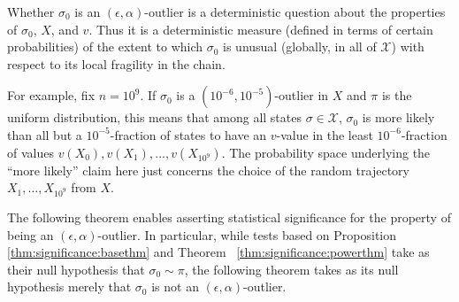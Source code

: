 \documentclass[12pt]{article}
\begin{document}
Whether \( \sigma_0 \) is an \( (\epsilon, \alpha) \)-outlier is a
deterministic question about the properties of \( \sigma_0 \), \( X \),
and \( v \).  Thus it is a deterministic measure (defined in terms of
certain probabilities) of the extent to which \( \sigma_0 \) is unusual
(globally, in all of \( \mathcal{X} \)) with respect to its local
fragility in the chain.

\begin{example}
    For example, fix \( n = 10^9 \).  If \( \sigma_0 \) is a \( (10^{-6},
    10^{-5}) \)-outlier in \( X \) and \( \pi \) is the uniform
    distribution, this means that among all states \( \sigma \in
    \mathcal{X} \), \( \sigma_0 \) is more likely than all but a \( 10^{-5}
    \)-fraction of states to have an \( v \)-value in the least \( 10^{-6}
    \)-fraction of values \( v(X_0), v(X_1 ), \dots , v(X_{10^9} ) \).
    The probability space underlying the ``more likely'' claim here just
    concerns the choice of the random trajectory \( X_1, \dots, X_{10^9}
    \) from \( X \).
\end{example}

The following theorem enables asserting statistical significance for the
property of being an \( (\epsilon, \alpha) \)-outlier.  In particular,
while tests based on Proposition~%
\ref{thm:significance:basethm} and Theorem~%
\ref{thm:significance:powerthm} take as their null hypothesis that \(
\sigma_0 \sim \pi \), the following theorem takes as its null hypothesis
merely that \( \sigma_{0} \) is not an \( (\epsilon, \alpha) \)-outlier.
\end{document}
